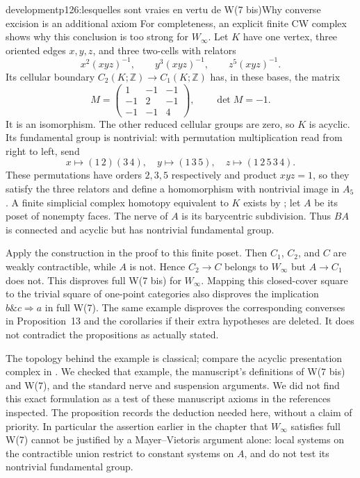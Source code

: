 \begin{dcomment}{development}{p126:lesquelles sont vraies en vertu de W(7 bis)}{Why converse excision is an additional axiom}
For completeness, an explicit finite CW complex shows why this conclusion is too strong for $W_\infty$.  Let $K$ have one vertex, three oriented edges $x,y,z$, and three two-cells with relators
\[
 x^2(xyz)^{-1},\qquad y^3(xyz)^{-1},\qquad z^5(xyz)^{-1}.
\]
Its cellular boundary $C_2(K;\mathbb Z)\to C_1(K;\mathbb Z)$ has, in these bases, the matrix
\[
 M=\begin{pmatrix}1&-1&-1\\-1&2&-1\\-1&-1&4\end{pmatrix},
 \qquad \det M=-1.
\]
It is an isomorphism.  The other reduced cellular groups are zero, so $K$ is acyclic.  Its fundamental group is nontrivial: with permutation multiplication read from right to left, send
\[
 x\longmapsto(1\,2)(3\,4),\quad
 y\longmapsto(1\,3\,5),\quad
 z\longmapsto(1\,2\,5\,3\,4).
\]
These permutations have orders $2,3,5$ respectively and product $xyz=1$, so they satisfy the three relators and define a homomorphism with nontrivial image in $A_5$.  A finite simplicial complex homotopy equivalent to $K$ exists by \citet[Theorem~2C.5]{Hatcher2002}; let $A$ be its poset of nonempty faces.  The nerve of $A$ is its barycentric subdivision.  Thus $BA$ is connected and acyclic but has nontrivial fundamental group.

Apply the construction in the proof to this finite poset.  Then $C_1$, $C_2$, and $C$ are weakly contractible, while $A$ is not.  Hence $C_2\to C$ belongs to $W_\infty$ but $A\to C_1$ does not.  This disproves full W(7 bis) for $W_\infty$.  Mapping this closed-cover square to the trivial square of one-point categories also disproves the implication $b\mathbin{\&}c\Rightarrow a$ in full W(7).  The same example disproves the corresponding converses in Proposition~13 and the corollaries if their extra hypotheses are deleted.  It does not contradict the propositions as actually stated.

The topology behind the example is classical; compare the acyclic presentation complex in \citet[Example~2.38]{Hatcher2002}.  We checked that example, the manuscript's definitions of W(7 bis) and W(7), and the standard nerve and suspension arguments.  We did not find this exact formulation as a test of these manuscript axioms in the references inspected.  The proposition records the deduction needed here, without a claim of priority.  In particular the assertion earlier in the chapter that $W_\infty$ satisfies full W(7) cannot be justified by a Mayer--Vietoris argument alone: local systems on the contractible union restrict to constant systems on $A$, and do not test its nontrivial fundamental group.


\end{dcomment}
